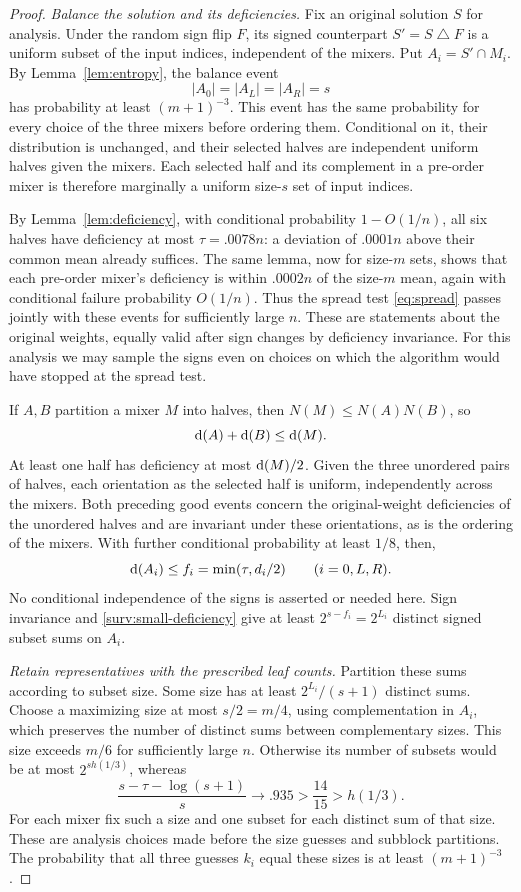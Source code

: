 \begin{proof}
\emph{Balance the solution and its deficiencies.}
Fix an original solution \(S\) for analysis. Under the random sign flip
\(F\), its signed counterpart \(S'=S\mathbin{\triangle}F\) is a uniform
subset of the input indices, independent of the mixers. Put
\(A_i=S'\cap M_i\). By Lemma~\ref{lem:entropy}, the balance event
\[
 |A_0|=|A_L|=|A_R|=s
\]
has probability at least \((m+1)^{-3}\). This event has the same
probability for every choice of the three mixers before ordering them.
Conditional on it, their distribution is unchanged, and their selected
halves are independent uniform halves given the mixers. Each selected
half and its complement in a pre-order mixer is therefore marginally a
uniform size-\(s\) set of input indices.

By Lemma~\ref{lem:deficiency}, with conditional probability
\(1-O(1/n)\), all six halves have deficiency at most
\(\tau=.0078n\): a deviation of \(.0001n\) above their common mean
already suffices. The same lemma, now for size-\(m\) sets, shows that
each pre-order mixer's deficiency is within \(.0002n\) of the
size-\(m\) mean, again with conditional failure probability \(O(1/n)\).
Thus the spread test \eqref{eq:spread} passes jointly with these events
for sufficiently large \(n\). These are statements about the original
weights, equally valid after sign changes by deficiency invariance.
For this analysis we may sample the signs even on choices on which the
algorithm would have stopped at the spread test.

If \(A,B\) partition a mixer \(M\) into halves, then
\(N(M)\le N(A)N(B)\), so
\[
 \mathrm{d}(A)+\mathrm{d}(B)\le \mathrm{d}(M).
\]
At least one half has deficiency at most \(\mathrm{d}(M)/2\). Given the
three unordered pairs of halves, each orientation as the selected half
is uniform, independently across the mixers. Both preceding good events concern the original-weight deficiencies
of the unordered halves and are invariant under these orientations,
as is the ordering of the mixers. With further conditional probability at least \(1/8\), then,
\begin{equation}\label{surv:small-deficiency}
 \mathrm{d}(A_i)\le f_i=\min(\tau,d_i/2)
 \qquad(i=0,L,R).
\end{equation}
No conditional independence of the signs is asserted or needed here.
Sign invariance and \eqref{surv:small-deficiency} give at least
\(2^{s-f_i}=2^{L_i}\) distinct signed subset sums on \(A_i\).

\emph{Retain representatives with the prescribed leaf counts.}
Partition these sums according to subset size. Some size has at least
\(2^{L_i}/(s+1)\) distinct sums. Choose a maximizing size at most
\(s/2=m/4\), using complementation in \(A_i\), which preserves the
number of distinct sums between complementary sizes. This size exceeds
\(m/6\) for sufficiently large \(n\). Otherwise its number of subsets
would be at most \(2^{s h(1/3)}\), whereas
\[
 \frac{s-\tau-\log(s+1)}{s}\longrightarrow .935
 >\frac{14}{15}>h(1/3).
\]
For each mixer fix such a size and one subset for each distinct sum of
that size. These are analysis choices made before the size guesses and
subblock partitions. The probability that all three guesses \(k_i\)
equal these sizes is at least \((m+1)^{-3}\).


\end{proof}

